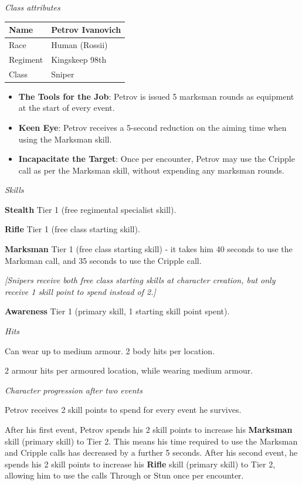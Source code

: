 \textit{Class attributes}

\begin{table}
\begin{tabular}{|l|l|} \hline 
Name & Petrov Ivanovich \\
 \hline Race & Human (Rossii) \\
 \hline Regiment & Kingskeep 98th \\
 \hline Class & Sniper \\
 \hline \end{tabular}

\end{table}

\begin{itemize}
\item \textbf{The Tools for the Job}: Petrov is issued 5 marksman rounds as equipment at the start of every event.

\item \textbf{Keen Eye}: Petrov receives a 5-second reduction on the aiming time when using the Marksman skill.

\item \textbf{Incapacitate the Target}: Once per encounter, Petrov may use the Cripple call as per the Marksman skill, without expending any marksman rounds.

\end{itemize}
\textit{Skills}

\textbf{Stealth} Tier 1 (free regimental specialist skill).

\textbf{Rifle} Tier 1 (free class starting skill).

\textbf{Marksman} Tier 1 (free class starting skill) - it takes him 40 seconds to use the Marksman call, and 35 seconds to use the Cripple call.

\textit{{[}Snipers receive both free class starting skills at character creation, but only receive 1 skill point to spend instead of 2.{]}}

\textbf{Awareness} Tier 1 (primary skill, 1 starting skill point spent).

\textit{Hits}

Can wear up to medium armour. 2 body hits per location.

2 armour hits per armoured location, while wearing medium armour.

\textit{Character progression after two events}

Petrov receives 2 skill points to spend for every event he survives.

After his first event, Petrov spends his 2 skill points to increase his \textbf{Marksman} skill (primary skill) to Tier 2. This means his time required to use the Marksman and Cripple calls has decreased by a further 5 seconds. After his second event, he spends his 2 skill points to increase his \textbf{Rifle} skill (primary skill) to Tier 2, allowing him to use the calls Through or Stun once per encounter.

